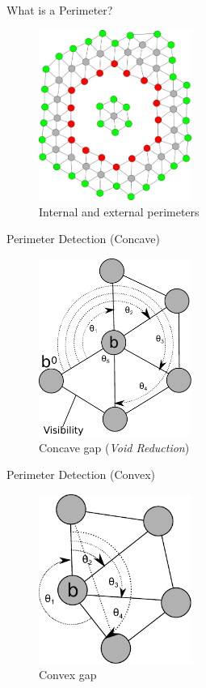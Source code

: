 \documentclass{beamer}
\begin{document}
\begin{frame}{What is a Perimeter?}
  \begin{figure}
    \begin{center}
      \includegraphics[width=5cm]{Perimeters.pdf}
    \end{center}
    \caption{Internal and external perimeters}
  \end{figure}
\end{frame}


\begin{frame}{Perimeter Detection (Concave)}
  \begin{figure}
    \begin{center}
      \includegraphics[width=5cm]{Perimeter1.pdf}
    \end{center}
    \caption{Concave gap (\textit{Void Reduction})}
  \end{figure}
\end{frame}

\begin{frame}{Perimeter Detection (Convex)}
  \begin{figure}
    \begin{center}
      \includegraphics[width=5cm]{Perimeter2.pdf}
    \end{center}
    \caption{Convex gap}
  \end{figure}
\end{frame}
\end{document}
